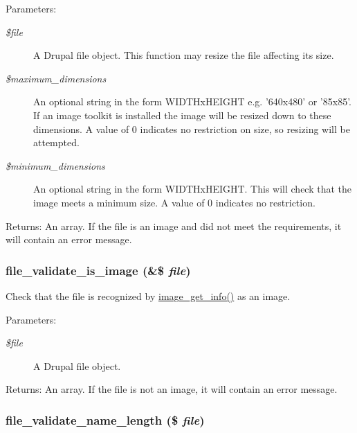 \begin{Desc}
\item[Parameters:]
\begin{description}
\item[{\em \$file}]A Drupal file object. This function may resize the file affecting its size. \item[{\em \$maximum\_\-dimensions}]An optional string in the form WIDTHxHEIGHT e.g. '640x480' or '85x85'. If an image toolkit is installed the image will be resized down to these dimensions. A value of 0 indicates no restriction on size, so resizing will be attempted. \item[{\em \$minimum\_\-dimensions}]An optional string in the form WIDTHxHEIGHT. This will check that the image meets a minimum size. A value of 0 indicates no restriction. \end{description}
\end{Desc}
\begin{Desc}
\item[Returns:]An array. If the file is an image and did not meet the requirements, it will contain an error message. \end{Desc}
\hypertarget{group__file_gbabb21f40d60d2cbd21953d0935abdb7}{
\subsubsection[{file\_\-validate\_\-is\_\-image}]{\setlength{\rightskip}{0pt plus 5cm}file\_\-validate\_\-is\_\-image (\&\$ {\em file})}}
\label{group__file_gbabb21f40d60d2cbd21953d0935abdb7}


Check that the file is recognized by \hyperlink{group__image_g64daec548dec0ae4c1d30053446e8f80}{image\_\-get\_\-info()} as an image.

\begin{Desc}
\item[Parameters:]
\begin{description}
\item[{\em \$file}]A Drupal file object. \end{description}
\end{Desc}
\begin{Desc}
\item[Returns:]An array. If the file is not an image, it will contain an error message. \end{Desc}
\hypertarget{group__file_ga70aadd824b8e9b654597c4fb6b6c70a}{
\subsubsection[{file\_\-validate\_\-name\_\-length}]{\setlength{\rightskip}{0pt plus 5cm}file\_\-validate\_\-name\_\-length (\$ {\em file})}}
\label{group__file_ga70aadd824b8e9b654597c4fb6b6c70a}


